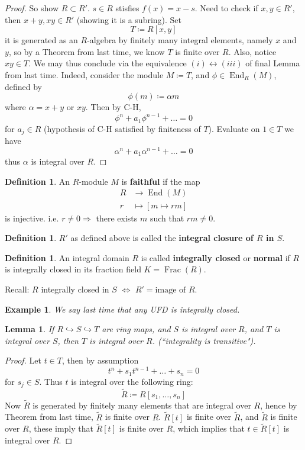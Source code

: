\documentclass[12pt]{article}
\DeclareMathOperator{\End}{End}
\DeclareMathOperator{\Frac}{Frac}
\newcommand{\mapp}[4]{\begin{align*}
#1 &\to #2\\
#3 & \mapsto #4
\end{align*}}
\newtheorem{lemma}[theorem]{Lemma}
\newtheorem*{eg}{Example}
\theoremstyle{definition}
\newtheorem{definition}[theorem]{Definition}
\begin{document}
\begin{proof}
So show $R\subset R'$. $s\in R$ stisfies $f(x) = x-s$. Need to check if $x,y \in R'$, then $x+y,xy \in R'$ (showing it is a subring). Set 
\[
T \coloneqq R[x,y]
\]
it is generated as an $R$-algebra by finitely many integral elements, namely $x$ and $y$, so by a Theorem from last time, we know $T$ is finite over $R$. Also, notice $xy\in T$. We may thus conclude via the equivalence $(i) \leftrightarrow(iii)$ of final Lemma from last time. Indeed, consider the module $M \coloneqq T$, and $\phi \in \End_R(M)$, defined by
\[
\phi(m) \coloneqq \alpha m
\]
where $\alpha = x+y$ or $xy$. Then by C-H, 
\[
\phi^n + a_1\phi^{n-1} + \dots = 0
\]
for $a_j \in R$ (hypothesis of C-H satisfied by finiteness of $T$). Evaluate on $1\in T$ we have 
\[
\alpha^n +a_1\alpha^{n-1} + \dots =0
\]
thus $\alpha$ is integral over $R$.
\end{proof}
\begin{definition}
An $R$-module $M$ is \textbf{faithful} if the map
\[
\mapp{R}{\End(M)}{r}{[m\mapsto rm]}
\]
is injective. i.e. $r\neq 0 \Rightarrow $ there exists $m$ such that $rm \neq 0$. 
\end{definition}
\begin{definition}
$R'$ as defined above is called the \textbf{integral closure of $R$ in $S$}.
\end{definition}
\begin{definition}
An integral domain $R$ is called \textbf{integrally closed} or \textbf{normal} if $R$ is integrally closed in its fraction field $K = \Frac(R)$.
\end{definition}
Recall: $R$ integrally closed in $S$ $\iff$ $R'= \text{image of }R$.
\begin{eg}
We say last time that any UFD is integrally closed.
\end{eg}
\begin{lemma}
If $R\hookrightarrow S \hookrightarrow T$ are ring maps, and $S$ is integral over $R$, and $T$ is integral over $S$, then $T$ is integral over $R$. (``integrality is transitive").
\end{lemma}
\begin{proof}
Let $t\in T$, then by assumption 
\[
t^n+s_1t^{n-1}+\dots+s_n =0
\]
for $s_j\in S$. Thus $t$ is integral over the following ring:
\[
\tilde{R}\coloneqq R[s_1,\dots,s_n]
\]
Now $\tilde{R}$ is generated by finitely many elements that are integral over $R$, hence by Theorem from last time, $\tilde{R}$ is finite over $R$. $\tilde{R}[t]$ is finite over $\tilde{R}$, and $\tilde{R}$ is finite over $R$, these imply that $\tilde{R}[t]$ is finite over $R$, which implies that $t\in \tilde{R}[t]$ is integral over $R$.
\end{proof}
\end{document}
